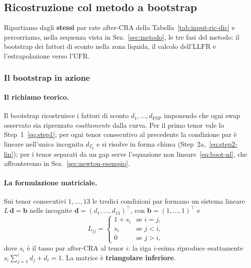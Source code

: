 \documentclass[11pt,a4paper]{article}
\theoremstyle{plain}
\theoremstyle{definition}
\theoremstyle{remark}
\newcommand{\UFR}{\mathrm{UFR}}
\newcommand{\LLFR}{\mathrm{LLFR}}
\newcommand{\FSP}{\mathrm{FSP}}
\begin{document}
\subsection{Ricostruzione col metodo a bootstrap}
\label{sec:recon-bootstrap}

Ripartiamo dagli \textbf{stessi} par rate after-CRA della Tabella~\ref{tab:input-ric-dic} e
percorriamo, nella sequenza vista in Sez.~\ref{sec:metodo}, le tre fasi del metodo: il
bootstrap dei fattori di sconto nella zona liquida, il calcolo dell'$\LLFR$ e
l'estrapolazione verso l'$\UFR$.

\subsubsection{Il bootstrap in azione}
\label{sec:boot-azione}

\paragraph{Il richiamo teorico.}
Il bootstrap ricostruisce i fattori di sconto $d_1,\ldots,d_{\FSP}$ imponendo che ogni swap
osservato sia riprezzato \emph{esattamente} dalla curva. Per il primo tenor vale lo
Step~1~\eqref{eq:step1}; per ogni tenor consecutivo al precedente la condizione par \`e
lineare nell'unica incognita $d_{T_k}$ e si risolve in forma chiusa
(Step~2a,~\eqref{eq:step2-lin}); per i tenor separati da un gap serve l'equazione non
lineare~\eqref{eq:boot-nl}, che affronteremo in Sez.~\ref{sec:newton-esempio}.

\paragraph{La formulazione matriciale.}
Sui tenor consecutivi $1,\ldots,13$ le tredici condizioni par formano un sistema lineare
$L\,\mathbf d = \mathbf b$ nelle incognite $\mathbf d=(d_1,\ldots,d_{13})^\top$, con
$\mathbf b = (1,\ldots,1)^\top$ e
\[
  L_{ij} =
  \begin{cases}
    1 + s_i & \text{se } i = j,\\
    s_i     & \text{se } j < i,\\
    0       & \text{se } j > i,
  \end{cases}
\]
dove $s_i$ \`e il tasso par after-CRA al tenor $i$: la riga $i$-esima riproduce
esattamente $s_i\sum_{j=1}^{i} d_j + d_i = 1$. La matrice \`e \textbf{triangolare inferiore}.
\end{document}
